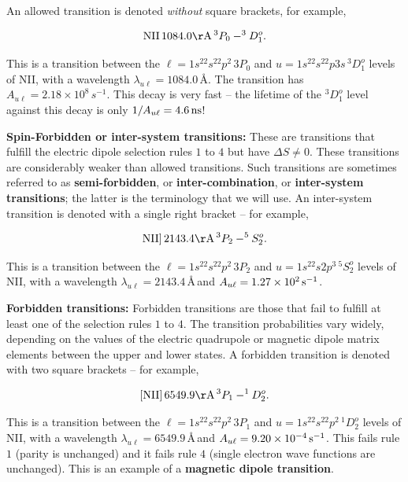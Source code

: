\documentclass[a4paper,10pt]{article}
\begin{document}
{\noindent}An allowed transition is denoted \textit{without} square brackets, for example,

\begin{align*}
    {\rm NII}\,1084.0{\rm \AA}\,^3P_0-^3D_1^o.
\end{align*}

{\noindent}This is a transition between the $\ell=1s^22s^22p^2\,3P_0$ and $u=1s^22s^22p3s\,^3D_1^o$ levels of NII, with a wavelength $\lambda_{u\ell}=1084.0$\,\AA. The transition has $A_{u\ell}=2.18\times10^8\,{s^{-1}}$. This decay is very fast -- the lifetime of the $^3D_1^o$ level against this decay is only $1/A_{u\ell}=4.6\,{\rm ns}$!

{\noindent}\textbf{Spin-Forbidden or inter-system transitions:} These are transitions that fulfill the electric dipole selection rules $1$ to $4$ but have $\Delta S\neq0$. These transitions are considerably weaker than allowed transitions. Such transitions are sometimes referred to as \textbf{semi-forbidden}, or \textbf{inter-combination}, or \textbf{inter-system transitions}; the latter is the terminology that we will use. An inter-system transition is denoted with a single right bracket -- for example,

\begin{align*}
    {\rm NII]}\,2143.4{\rm \AA}\,^3P_2-^5S_2^o.
\end{align*}

{\noindent}This is a transition between the $\ell=1s^22s^22p^2\,3P_2$ and $u=1s^22s2p^3\,^5S_2^o$ levels of NII, with a wavelength $\lambda_{u\ell}=2143.4$\,\AA\,and $A_{u\ell}=1.27\times10^2\,{\rm s^{-1}}$.

{\noindent}\textbf{Forbidden transitions:} Forbidden transitions are those that fail to fulfill at least one of the selection rules $1$ to $4$. The transition probabilities vary widely, depending on the values of the electric quadrupole or magnetic dipole matrix elements between the upper and lower states. A forbidden transition is denoted with two square brackets -- for example,

\begin{align*}
    {\rm [NII]}\,6549.9{\rm \AA}\,^3P_1-^1D_2^o.
\end{align*}

{\noindent}This is a transition between the $\ell=1s^22s^22p^2\,3P_1$ and $u=1s^22s^22p^2\,^1D_2^o$ levels of NII, with a wavelength $\lambda_{u\ell}=6549.9$\,\AA\,and $A_{u\ell}=9.20\times10^{-4}\,{\rm s^{-1}}$. This fails rule $1$ (parity is unchanged) and it fails rule $4$ (single electron wave functions are unchanged). This is an example of a \textbf{magnetic dipole transition}.
\end{document}
